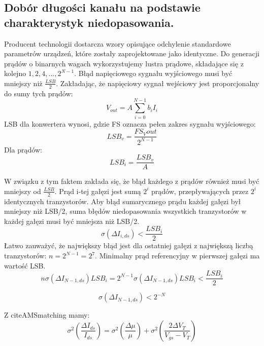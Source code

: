 \documentclass[10pt,a4paper]{report}
\begin{document}
	\subsection{Dobór długości kanału na podstawie charakterystyk niedopasowania.}
	{	Producent technologii dostarcza wzory opisujące odchylenie standardowe parametrów urządzeń, które zostały zaprojektowane jako identyczne. Do generacji prądów o binarnych wagach wykorzystujemy lustra prądowe, składające się z kolejno $1, 2, 4,..., 2^{N-1}$. Błąd napięciowego sygnału wyjściowego musi być mniejszy niż $\frac{LSB}{2}$. Zakładając, że napięciowy sygnał wejściowy jest proporcjonalny do sumy tych prądów:
		\begin{equation}
		V_{out} = A \sum_{i=0}^{N-1} b_{i}I_{i}
		\end{equation}
	LSB dla konwertera wynosi, gdzie FS oznacza pełen zakres sygnału wyjściowego:
		\begin{equation}
			LSB_v = \frac{FS_Vout}{2^{N-1}}
		\end{equation}
	Dla prądów:
		\begin{equation}
			LSB_i = \frac{LSB_v}{A}
		\end{equation}

	W związku z tym faktem zakłada się, że błąd każdego z prądów również musi być mniejszy od $\frac{LSB}{2}$. Prąd i-tej gałęzi jest sumą $2^{i}$ prądów, przepływających przez $2^{i}$ identycznych tranzystorów. Aby błąd sumarycznego prądu każdej gałęzi był mniejszy niż LSB/2, suma błędów niedopasowania wszystkich tranzystorów w każdej gałęzi musi być mniejsza niż LSB/2. 
		\begin{equation}
			\sigma \left( \Delta I_{i,ds} \right) < \frac{LSB_i}{2}
		\end{equation}
	Łatwo zauważyć, że największy błąd jest dla ostatniej gałęzi z największą liczbą tranzystorów: $n=2^{N-1}=2^7$. Minimalny prąd referencyjny w pierwszej gałęzi ma wartość LSB.
		\begin{equation}
		n \sigma \left( \Delta I_{N-1,ds} \right) LSB_i = 2^{N-1} \sigma \left( \Delta I_{N-1,ds} \right) LSB_i < \frac{LSB_i}{2}
		\end{equation}

		\begin{equation}
			\sigma \left( \Delta I_{N-1,ds} \right) < 2^{-N}
		\end{equation}

	Z cite{AMSmatching} mamy:
		\begin{equation}
			\sigma^2 \left( \frac{\Delta I_{ds}}{I_{ds}}\right) = 	\sigma^2 \left( \frac{\Delta \mu}{\mu}\right) + \sigma^2 \left( \frac{2\Delta V_T}{V_{gs} - V_{T}}\right)
		\end{equation}
		
}
\end{document}
